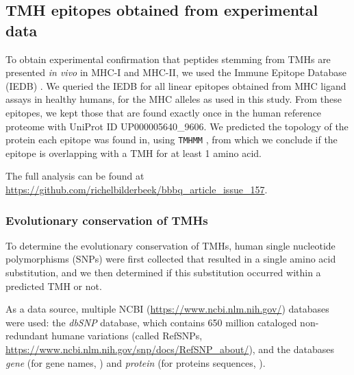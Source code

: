 \subsection{TMH epitopes obtained from experimental data}\label{subsec:elution_studies}

To obtain experimental confirmation that peptides stemming from TMHs 
are presented \emph{in vivo} in MHC-I and MHC-II,
we used the Immune Epitope Database (IEDB) \cite{vita2019immune}.
We queried the IEDB for all linear epitopes obtained
from MHC ligand assays in healthy humans, 
for the MHC alleles as used in this study.
From these epitopes, we kept those that are found
exactly once in the human reference proteome
with UniProt ID UP000005640\_9606.
We predicted the topology of the protein each epitope
was found in, using \verb;TMHMM; \cite{krogh2001predicting},
from which we conclude if the epitope is overlapping with a TMH
for at least 1 amino acid.

The full analysis can be found
at \url{https://github.com/richelbilderbeek/bbbq_article_issue_157}.

\subsubsection{Evolutionary conservation of TMHs}


To determine the evolutionary conservation of TMHs,
human single nucleotide polymorphisms (SNPs) were first collected
that resulted in a single amino acid substitution,
and we then determined if this substitution occurred within a predicted TMH or not.


As a data source, multiple
NCBI (\url{https://www.ncbi.nlm.nih.gov/}) databases were used: 
the \emph{dbSNP} \cite{sherry2001dbsnp} database,
which contains 650 million 
cataloged non-redundant humane variations (called RefSNPs,
\url{https://www.ncbi.nlm.nih.gov/snp/docs/RefSNP_about/}), and the databases \emph{gene} (for gene names, \cite{brown2015gene})
and \emph{protein} (for proteins sequences, \cite{sayers2010database}).

